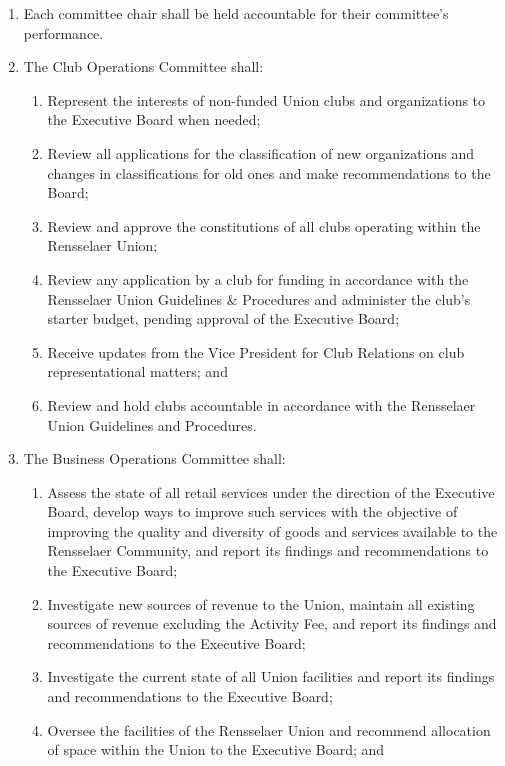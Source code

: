 \begin{enumerate}
  \begin{enumerate}
  \item Attendance shall be recorded at all committee meetings and submitted to the Vice President for Board Operations.
  \end{enumerate}
\item Each committee chair shall be held accountable for their committee’s performance.
\item The Club Operations Committee shall:
  \begin{enumerate}
  \item Represent the interests of non-funded Union clubs and organizations to the Executive Board when needed;
  \item Review all applications for the classification of new organizations and changes in classifications for old ones and make recommendations to the Board;
  \item Review and approve the constitutions of all clubs operating within the Rensselaer Union;
  \item Review any application by a club for funding in accordance with the Rensselaer Union Guidelines \& Procedures and administer the club’s starter budget, pending approval of the Executive Board;
  \item Receive updates from the Vice President for Club Relations on club representational matters; and
  \item Review and hold clubs accountable in accordance with the Rensselaer Union Guidelines and Procedures.
  \end{enumerate}
\item The Business Operations Committee shall:
  \begin{enumerate}
  \item Assess the state of all retail services under the direction of the Executive Board, develop ways to improve such services with the objective of improving the quality and diversity of goods and services available to the Rensselaer Community, and report its findings and recommendations to the Executive Board;
  \item Investigate new sources of revenue to the Union, maintain all existing sources of revenue excluding the Activity Fee, and report its findings and recommendations to the Executive Board;
  \item Investigate the current state of all Union facilities and report its findings and recommendations to the Executive Board;
  \item Oversee the facilities of the Rensselaer Union and recommend allocation of space within the Union to the Executive Board; and

\end{enumerate}
\end{enumerate}
